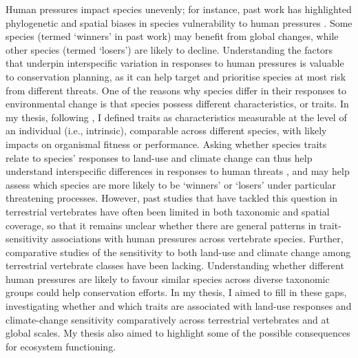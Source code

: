 Human pressures impact species unevenly; for instance, past work has highlighted phylogenetic and spatial biases in species vulnerability to human pressures \citep{Fritz2009, Yessoufou2012, Ducatez2017, Weeks2022}. Some species (termed `winners' in past work) may benefit from global changes, while other species (termed `losers') are likely to decline. Understanding the factors that underpin interspecific variation in responses to human pressures is valuable to conservation planning, as it can help target and prioritise species at most risk from different threats. One of the reasons why species differ in their responses to environmental change is that species possess different characteristics, or traits. In my thesis, following \citet{McGill2006}, I defined traits as characteristics measurable at the level of an individual (i.e., intrinsic), comparable across different species, with likely impacts on organismal fitness or performance. Asking whether species traits relate to species' responses to land-use and climate change can thus help understand interspecific differences  in responses to human threats \citep{Munstermann2021}, and may help assess which species are more likely to be `winners' or `losers' under particular threatening processes. However, past studies that have tackled this question in terrestrial vertebrates have often been limited in both taxonomic and spatial coverage, so that it remains unclear whether there are general patterns in trait-sensitivity associations with human pressures across vertebrate species. Further, comparative studies of the sensitivity to both land-use and climate change among terrestrial vertebrate classes have been lacking. Understanding whether different human pressures are likely to favour similar species across diverse taxonomic groups could help conservation efforts. In my thesis, I aimed to fill in these gaps, investigating whether and which traits are associated with land-use responses and climate-change sensitivity comparatively across terrestrial vertebrates  and at global scales. My thesis also aimed to highlight some of the possible consequences for ecosystem functioning. 

